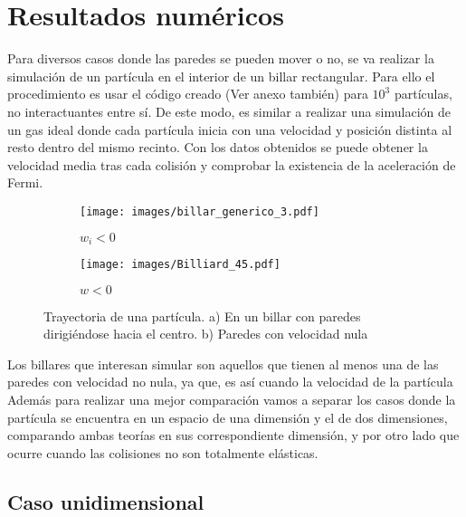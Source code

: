 %

%

\chapter{Resultados numéricos}

Para diversos casos donde las paredes se pueden mover o no, se va realizar la simulación de un partícula en el interior de un billar rectangular. Para ello el procedimiento es usar el código creado \cite{MiCodigo} (Ver anexo también) para \( 10^3 \) partículas, no interactuantes entre sí. De este modo, es similar a realizar una simulación de un gas ideal donde cada partícula inicia con una velocidad y posición distinta al resto dentro del mismo recinto. Con los datos obtenidos se puede obtener la velocidad media tras cada colisión y comprobar la existencia de la aceleración de Fermi.

\begin{figure}[H]
    \begin{subfigure}[b]{0.5\textwidth}
        \centering
        \texttt{[image: images/billar\_generico\_3.pdf]}
        \caption{$w_i<0$}
        \label{fig:a}
    \end{subfigure}
    \hfill
    \begin{subfigure}[b]{0.5\textwidth}
        \centering
        \texttt{[image: images/Billiard\_45.pdf]}
        \caption{$w<0$}
        \label{fig:s}
    \end{subfigure}
    \caption{Trayectoria de una partícula. a) En un billar con paredes dirigiéndose hacia el centro. b) Paredes con velocidad nula}
\end{figure}


Los billares que interesan simular son aquellos que tienen al menos una de las paredes con velocidad no nula, ya que, es así cuando la velocidad de la partícula  Además para realizar una mejor comparación vamos a separar los casos donde la partícula se encuentra en un espacio de una dimensión y el de dos dimensiones, comparando ambas teorías en sus correspondiente dimensión, y por otro lado que ocurre cuando las colisiones no son totalmente elásticas.

\section{Caso unidimensional}

